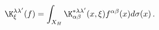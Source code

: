 \begin{equation}
{\K}^{\lambda\lambda'}_{\xi}(f)=\int_{X_{H}}{\K}_{\alpha\beta}^{*\lambda\lambda'}(x,\xi)f^{\alpha\beta}(x)d\sigma(x)\,.
\end{equation}


